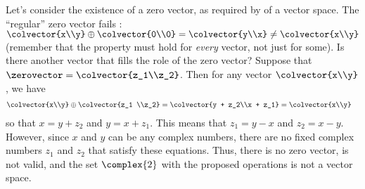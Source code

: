 %
Let's consider the existence of a zero vector, as required by  of a vector space.  The ``regular'' zero vector fails : $\colvector{x\\y}\oplus\colvector{0\\0} = \colvector{y\\x}\ne\colvector{x\\y}$ (remember that the property must hold for {\it{every}} vector, not just for some).  Is there another vector that fills the role of the zero vector?  Suppose that $\zerovector=\colvector{z_1\\z_2}$.  Then for any vector $\colvector{x\\y}$, we have 
%
\begin{align*}
\colvector{x\\y}\oplus\colvector{z_1 \\z_2} 
&= \colvector{y + z_2\\x + z_1} 
=  \colvector{x\\y}
\end{align*}
%
so that $x = y + z_2$ and $y = x + z_1$.  This means that $z_1 = y - x$ and $z_2 = x - y$.  However, since $x$ and $y$ can be any complex numbers, there are no fixed complex numbers $z_1$ and $z_2$ that satisfy these equations.  Thus, there is no zero vector,   is not valid, and the set  $\complex{2}$ with the proposed operations is not a vector space.